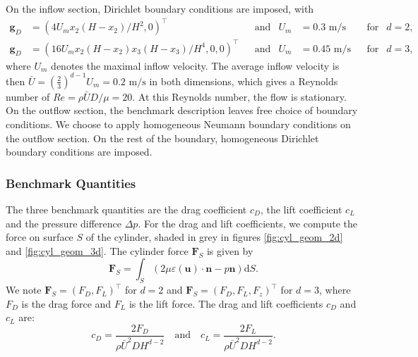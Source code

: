 \documentclass[11pt,a4paper]{article}
\renewcommand{\vec}[1]{\boldsymbol{#1}}
\newcommand{\vvecT}[3]{\left(#2,#3 \right)^{\top}}
\newcommand{\vvvecT}[4]{\left(#2,#3,#4 \right)^{\top}}
\newcommand{\dd}{\mathrm{d}}
\begin{document}
On the inflow section, Dirichlet boundary conditions are imposed, with
\begin{align*}
   \vec{g}_D
&= \vvecT{c}{4 U_m x_2 (H-x_2) / H^2}{0}
& &\mbox{and} &
   U_m
&= 0.3\mbox{ m/s}
& &\mbox{for} &
   d=2
,\\
   \vec{g}_D
&= \vvvecT{c}{16 U_m x_2 (H-x_2) x_3 (H-x_3) / H^4}{0}{0}
& &\mbox{and} &
   U_m
&= 0.45\mbox{ m/s}
& &\mbox{for} &
   d=3
,
\end{align*}
where $U_m$ denotes the maximal inflow velocity.  The average inflow
velocity is then $\bar{U}=(\frac{2}{3})^{d-1}U_m=0.2\mbox{ m/s}$ in
both dimensions, which gives a Reynolds number of
$Re=\rho\bar{U}D/\mu=20$.  At this Reynolds number, the flow is
stationary.  On the outflow section, the benchmark description
\cite{schaefer:1996} leaves free choice of boundary conditions.  We
choose to apply homogeneous Neumann boundary conditions on the outflow
section.  On the rest of the boundary, homogeneous Dirichlet boundary
conditions are imposed.


\subsubsection{Benchmark Quantities}

The three benchmark quantities are the drag coefficient $c_D$, the
lift coefficient $c_L$ and the pressure difference $\Delta p$.  For
the drag and lift coefficients, we compute the force on surface $S$ of
the cylinder, shaded in grey in figures \ref{fig:cyl_geom_2d}
and \ref{fig:cyl_geom_3d}.  The cylinder force $\vec{F}_S$ is given by
\begin{equation*}
  \vec{F}_S
= \int_{S}\left( 2\mu\varepsilon(\vec{u})\cdot\vec{n} - p\vec{n} \right) \dd S.
\end{equation*}
We note $\vec{F}_S=\vvecT{l}{F_D}{F_L}$ for $d=2$ and
$\vec{F}_S=\vvvecT{l}{F_D}{F_L}{F_z}$ for $d=3$, where $F_D$ is the
drag force and $F_L$ is the lift force.  The drag and lift
coefficients $c_D$ and $c_L$ are:
\begin{equation*}
  c_D = \frac{2 F_D}{\rho\bar{U}^2 D H^{d-2}}
  \quad\mbox{and}\quad
  c_L = \frac{2 F_L}{\rho\bar{U}^2 D H^{d-2}}.
\end{equation*}
\end{document}

